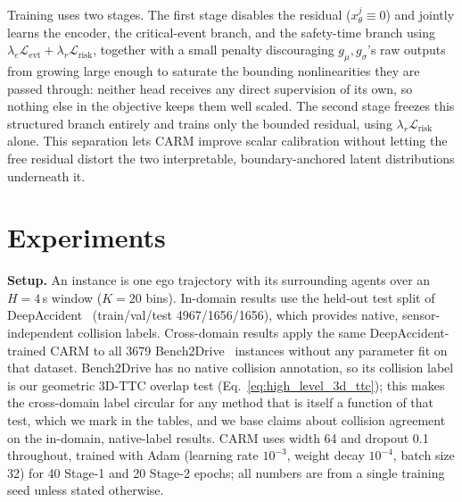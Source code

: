 \documentclass[letterpaper, 10 pt, conference]{ieeeconf}  %
\begin{document}
Training uses two stages. The first stage disables the residual
($x_\theta^j\equiv0$) and jointly learns the encoder, the critical-event
branch, and the safety-time branch using $\lambda_e\mathcal
L_{\mathrm{evt}}+\lambda_r\mathcal L_{\mathrm{risk}}$, together with a
small penalty discouraging $g_\mu,g_\sigma$'s raw outputs from growing
large enough to saturate the bounding nonlinearities they are passed
through: neither head receives any direct supervision of its own, so
nothing else in the objective keeps them well scaled. The second stage
freezes this structured branch entirely and trains only the bounded
residual, using $\lambda_r\mathcal L_{\mathrm{risk}}$ alone. This
separation lets CARM improve scalar calibration without letting the free
residual distort the two interpretable, boundary-anchored latent
distributions underneath it.

\section{Experiments}
\label{sec:experiments}

\noindent\textbf{Setup.}
An instance is one ego trajectory with its surrounding agents over an
$H=4$\,s window ($K=20$ bins). In-domain results use the held-out test
split of DeepAccident~\cite{deepaccident} (train/val/test
4967/1656/1656), which provides native, sensor-independent collision
labels. Cross-domain results apply the same DeepAccident-trained CARM to
all 3679 Bench2Drive~\cite{bench2drive} instances without any parameter
fit on that dataset. Bench2Drive has no native collision annotation, so
its collision label is our geometric 3D-TTC overlap test
(Eq.~\eqref{eq:high_level_3d_ttc}); this makes the cross-domain label
circular for any method that is itself a function of that test, which we
mark in the tables, and we base claims about collision agreement on the
in-domain, native-label results. CARM uses width 64 and dropout 0.1
throughout, trained with Adam (learning rate $10^{-3}$, weight decay
$10^{-4}$, batch size 32) for 40 Stage-1 and 20 Stage-2 epochs; all
numbers are from a single training seed unless stated otherwise.
\end{document}
